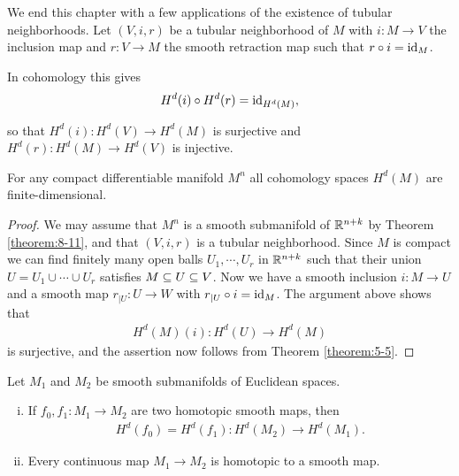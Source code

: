 We end this chapter with a few applications of the existence of tubular neighborhoods. 
Let $(V, i, r)$ be a tubular neighborhood of $M$ with $i:M\to V$ the inclusion map 
and $r:V\to M$ the smooth retraction map such that $r\circ i=\operatorname{id}_M$.

In cohomology this gives
\begin{align*}
  H^d(i)\circ H^d(r) =\operatorname{id}_{H^d(M)},
\end{align*}

so that $H^d(i):H^d(V)\to H^d(M)$ is surjective and $H^d(r):H^d(M)\to H^d(V)$ is injective.

\begin{proposition}\label{prop:9-25}
  For any compact differentiable manifold $M^n$ all cohomology spaces $H^d(M)$ are 
  finite-dimensional.
\end{proposition}


\begin{proof}
  We may assume that $M^n$ is a smooth submanifold of $\mathbb{R}^{n+k}$ by Theorem \ref{theorem:8-11}, 
  and that $(V, i, r)$ is a tubular neighborhood. Since $M$ is compact we can find
  finitely many open balls $U_1, \cdots, U_r$ in $\mathbb{R}^{n+k}$ such that their union $U=U_1\cup\cdots\cup U_r$
  satisfies $M\subseteq U\subseteq V$. Now we have a smooth inclusion $i:M\to U$ and a smooth
  map $r_{|U}:U\to W$ with $r_{|U}\circ i = \operatorname{id}_M$. The argument above shows that
  \begin{align*}
    H^d(M)(i):H^d(U)\to H^d(M)
  \end{align*}
  is surjective, and the assertion now follows from Theorem \ref{theorem:5-5}.
\end{proof}

\begin{proposition}\label{prop:9-26}
  Let $M_1$ and $M_2$ be smooth submanifolds of Euclidean spaces. 
  \begin{enumerate}[(i)]
    \item If $f_0, f_1:M_1\to M_2$ are two homotopic smooth maps, then 
      \begin{align*}
        H^d(f_0) = H^d(f_1):H^d(M_2)\to H^d(M_1).
      \end{align*}
    \item Every continuous map $M_1\to M_2$ is homotopic to a smooth map.
  \end{enumerate}
\end{proposition}

